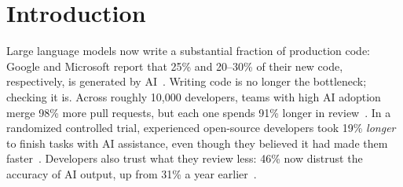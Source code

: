%
%              
%              
%
%

\section{Introduction}
\label{sec:intro}

Large language models now write a substantial fraction of production
code: Google and Microsoft report that 25\% and 20--30\% of their new
code, respectively, is generated by AI~\cite{pichai2024,nadella2025}.
Writing code is no longer the bottleneck; checking it is. Across
roughly 10,000 developers, teams with high AI adoption merge 98\% more
pull requests, but each one spends 91\% longer in review~\cite{faros2025}.
In a randomized controlled trial, experienced open-source developers
took 19\% \emph{longer} to finish tasks with AI assistance, even though
they believed it had made them faster~\cite{becker2025metr}. Developers
also trust what they review less: 46\% now distrust the accuracy of AI
output, up from 31\% a year earlier~\cite{stackoverflow2025}.

